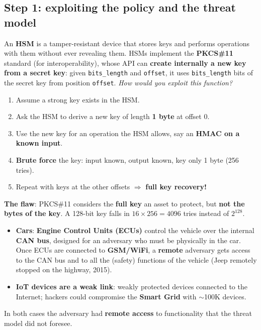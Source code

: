 \subsection{Step 1: exploiting the policy and the threat model}

\begin{exbox}[title={Misidentified assets: extracting keys from Hardware Security Modules (HSMs)}]
An \textbf{HSM} is a tamper-resistant device that stores keys and performs operations with them
without ever revealing them. HSMs implement the \textbf{PKCS\#11} standard (for interoperability),
whose API can \textbf{create internally a new key from a secret key}: given \texttt{bits\_length}
and \texttt{offset}, it uses \texttt{bits\_length} bits of the secret key from position
\texttt{offset}. \emph{How would you exploit this function?}
\begin{enumerate}
  \item Assume a strong key exists in the HSM.
  \item Ask the HSM to derive a new key of length \textbf{1 byte} at offset 0.
  \item Use the new key for an operation the HSM allows, say an \textbf{HMAC on a known input}.
  \item \textbf{Brute force} the key: input known, output known, key only 1 byte (256 tries).
  \item Repeat with keys at the other offsets $\Rightarrow$ \textbf{full key recovery!}
\end{enumerate}
\textbf{The flaw}: PKCS\#11 considers the \textbf{full key} an asset to protect, but \textbf{not the
bytes of the key}. A 128-bit key falls in $16 \times 256 = 4096$ tries instead of $2^{128}$.
\end{exbox}

\begin{exbox}[title={Unforeseen access capabilities: from cable to the air, IoT}]
\begin{itemize}
  \item \textbf{Cars}: \textbf{Engine Control Units (ECUs)} control the vehicle over the internal
        \textbf{CAN bus}, designed for an adversary who must be physically in the car. Once ECUs
        are connected to \textbf{GSM/WiFi}, a \textbf{remote} adversary gets access to the CAN bus
        and to all the (safety) functions of the vehicle (Jeep remotely stopped on the highway,
        2015).
  \item \textbf{IoT devices are a weak link}: weakly protected devices connected to the Internet;
        hackers could compromise the \textbf{Smart Grid} with $\sim$100K devices.
\end{itemize}
In both cases the adversary had \textbf{remote access} to functionality that the threat model did
not foresee.
\end{exbox}

